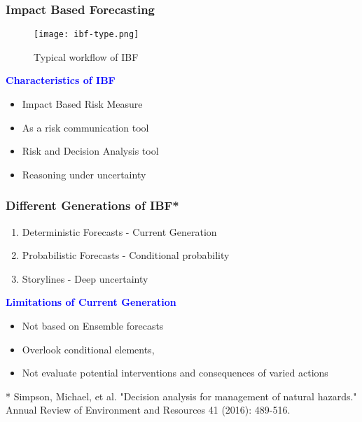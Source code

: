 \documentclass{beamer}
\begin{document}
\begin{frame}
	\frametitle{Impact Based Forecasting}
	\begin{figure}
		\texttt{[image: ibf-type.png]} 
		\caption{Typical workflow of IBF}
	\end{figure}
\vspace{1em}

\textcolor{blue}{\textbf{Characteristics of IBF}}
\begin{itemize}
	\item Impact Based Risk Measure
	\item As a risk communication tool
	\item Risk and Decision Analysis tool
	\item Reasoning under uncertainty
\end{itemize}

\end{frame}


\begin{frame}
	\frametitle{Different Generations of IBF*}
	\begin{enumerate}
		\item Deterministic Forecasts - Current Generation
		\item Probabilistic Forecasts - Conditional probability 
		\item Storylines - Deep uncertainty
   \end{enumerate}	

\textcolor{blue}{\textbf{Limitations of Current Generation}}
\begin{itemize}
	\item Not based on Ensemble forecasts
	\item Overlook conditional elements, 
	\item Not evaluate potential interventions and consequences of varied actions
\end{itemize}

		
	 \vspace{10em}
	\footnotesize{* Simpson, Michael, et al. "Decision analysis for management of natural hazards." Annual Review of Environment and Resources 41 (2016): 489-516.}
	
	
	
\end{frame}
\end{document}
